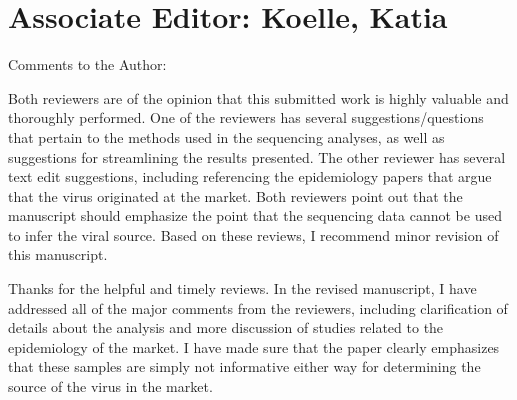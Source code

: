 \documentclass[11pt, oneside]{article}   	%
\newcommand{\response}[1]{{\color{black}#1}}
\begin{document}
\section*{Associate Editor: Koelle, Katia}

Comments to the Author:

Both reviewers are of the opinion that this submitted work is highly valuable and thoroughly performed. One of the reviewers has several suggestions/questions that pertain to the methods used in the sequencing analyses, as well as suggestions for streamlining the results presented. The other reviewer has several text edit suggestions, including referencing the epidemiology papers that argue that the virus originated at the market. Both reviewers point out that the manuscript should emphasize the point that the sequencing data cannot be used to infer the viral source. Based on these reviews, I recommend minor revision of this manuscript.

\response{
Thanks for the helpful and timely reviews.
In the revised manuscript, I have addressed all of the major comments from the reviewers, including clarification of details about the analysis and more discussion of studies related to the epidemiology of the market.
I have made sure that the paper clearly emphasizes that these samples are simply not informative either way for determining the source of the virus in the market.
}

\color{black}

{\small

}
\end{document}
